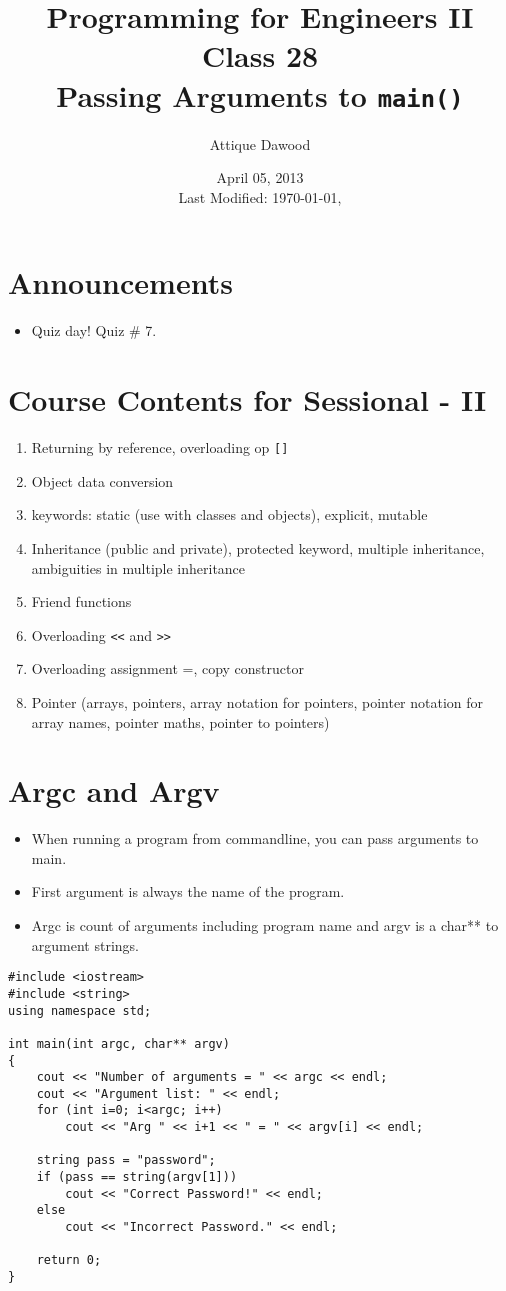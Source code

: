 \documentclass[12pt,a4paper]{article}
\title{\vspace{-2cm}Programming for Engineers II\\Class 28\\Passing Arguments to \texttt{main()}}
\author{Attique Dawood}
\date{April 05, 2013\\[0.2cm] Last Modified: \today, \currenttime}
\begin{document}
\maketitle
\section{Announcements}
\begin{itemize}
\item Quiz day! Quiz \# 7.
\end{itemize}
\section{Course Contents for Sessional - II}
\begin{enumerate}
\item Returning by reference, overloading op \verb|[]|
\item Object data conversion
\item keywords: static (use with classes and objects), explicit, mutable
\item Inheritance (public and private), protected keyword, multiple inheritance, ambiguities in multiple inheritance
\item Friend functions
\item Overloading \verb|<<| and \verb|>>|
\item Overloading assignment =, copy constructor
\item Pointer (arrays, pointers, array notation for pointers, pointer notation for array names, pointer maths, pointer to pointers)
\end{enumerate}
\section{Argc and Argv}
\begin{itemize}
\item When running a program from commandline, you can pass arguments to main.
\item First argument is always the name of the program.
\item Argc is count of arguments including program name and argv is a char** to argument strings.
\end{itemize}
\begin{lstlisting}[caption={Passing Arguments to main()}]
#include <iostream>
#include <string>
using namespace std;

int main(int argc, char** argv)
{
	cout << "Number of arguments = " << argc << endl;
	cout << "Argument list: " << endl;
	for (int i=0; i<argc; i++)
		cout << "Arg " << i+1 << " = " << argv[i] << endl;

	string pass = "password";
	if (pass == string(argv[1]))
		cout << "Correct Password!" << endl;
	else
		cout << "Incorrect Password." << endl;

	return 0;
}
\end{lstlisting}
\end{document}
